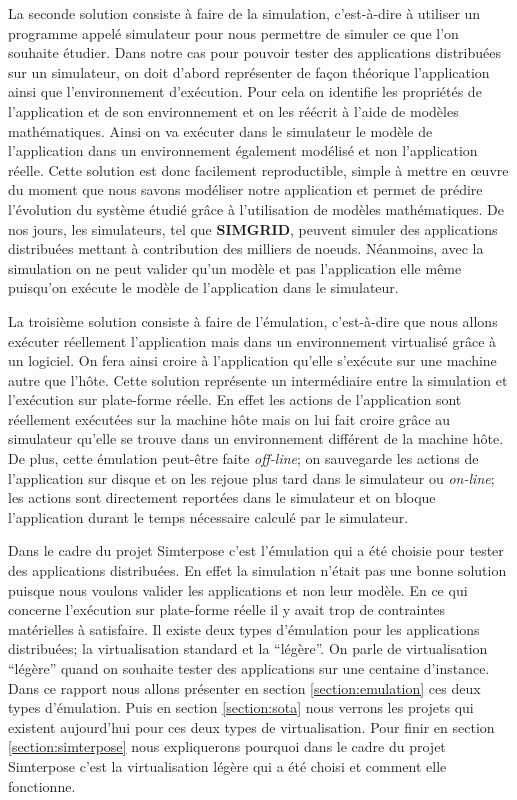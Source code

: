 La seconde solution consiste à faire de la simulation, c'est-à-dire à utiliser un programme appelé simulateur pour nous permettre de simuler ce que l'on souhaite étudier. Dans notre cas pour pouvoir tester des applications distribuées sur un simulateur, on doit d'abord représenter de façon théorique l'application ainsi que l'environnement d'exécution. Pour cela on identifie les propriétés de l'application et de son environnement et on les réécrit à l'aide de modèles mathématiques. Ainsi on va exécuter dans le simulateur le modèle de l'application dans un environnement également modélisé et non l'application réelle. Cette solution est donc facilement reproductible, simple à mettre en \oe uvre du moment que nous savons modéliser notre application et permet de prédire l'évolution du système étudié grâce à l'utilisation de modèles mathématiques. De nos jours, les simulateurs, tel que  \textbf{SIMGRID}\cite{MARTIN:SimGrid}, peuvent simuler des applications distribuées mettant à contribution des milliers de noeuds. Néanmoins, avec la simulation on ne peut valider qu'un modèle et pas l'application elle même puisqu'on exécute le modèle de l'application dans le simulateur. 

La troisième solution consiste à faire de l'émulation, c'est-à-dire que nous allons exécuter réellement l'application mais dans un environnement virtualisé grâce à un logiciel. On fera ainsi croire à l'application qu'elle s'exécute sur une machine autre que l'hôte. Cette solution représente un intermédiaire entre la simulation et l'exécution sur plate-forme réelle. En effet les actions de l'application sont réellement exécutées sur la machine hôte mais on lui fait croire grâce au simulateur qu'elle se trouve dans un environnement différent de la machine hôte. De plus, cette émulation peut-être faite \textit{off-line}; on sauvegarde les actions de l'application sur disque et on les rejoue plus tard dans le simulateur ou \textit{on-line}; les actions sont directement reportées dans le simulateur et on bloque l'application durant le temps nécessaire calculé par le simulateur.

Dans le cadre du projet Simterpose c'est l'émulation qui a été choisie pour tester des applications distribuées. En effet la simulation n'était pas une bonne solution puisque nous voulons valider les applications et non leur modèle. En ce qui concerne l'exécution sur plate-forme réelle il y avait trop de contraintes matérielles à satisfaire. Il existe deux types d'émulation pour les applications distribuées; la virtualisation standard et la ``légère''. On parle de virtualisation ``légère'' quand on souhaite tester des applications sur une centaine d'instance. Dans ce rapport nous allons présenter en section \ref{section:emulation} ces deux types d'émulation. Puis en section \ref{section:sota} nous verrons les projets qui existent aujourd'hui pour ces deux types de virtualisation. Pour finir en section \ref{section:simterpose} nous expliquerons pourquoi dans le cadre du projet Simterpose c'est la virtualisation légère qui a été choisi et comment elle fonctionne.



